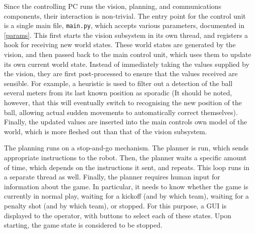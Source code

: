 Since the controlling PC runs the vision, planning, and communications
components, their interaction is non-trivial. The entry point for the control
unit is a single main file, \texttt{main.py}, which accepts various parameters,
documented in \cref{params}. This first starts the vision subsystem in its own
thread, and registers a hook for receiving new world states. These world states
are generated by the vision, and then passed back to the main control unit,
which uses them to update its own current world state. Instead of immediately
taking the values supplied by the vision, they are first post-processed to
ensure that the values received are sensible. For example, a heuristic is used
to filter out a detection of the ball several meters from its last known
position as sporadic (It should be noted, however, that this will eventually
switch to recognising the new position of the ball, allowing actual sudden
movements to automatically correct themselves). Finally, the updated values are
inserted into the main controls own model of the world, which is more fleshed
out than that of the vision subsystem.

The planning runs on a stop-and-go mechanism. The planner is run, which sends 
appropriate instructions to the robot. Then, the planner waits a specific
amount of time, which depends on the instructions it sent, and repeats. This
loop runs in a separate thread as well. Finally, the planner requires human
input for information about the game. In particular, it needs to know whether
the game is currently in normal play, waiting for a kickoff (and by which
team), waiting for a penalty shot (and by which team), or stopped. For this
purpose, a GUI is displayed to the operator, with buttons to select each of
these states. Upon starting, the game state is considered to be stopped.

